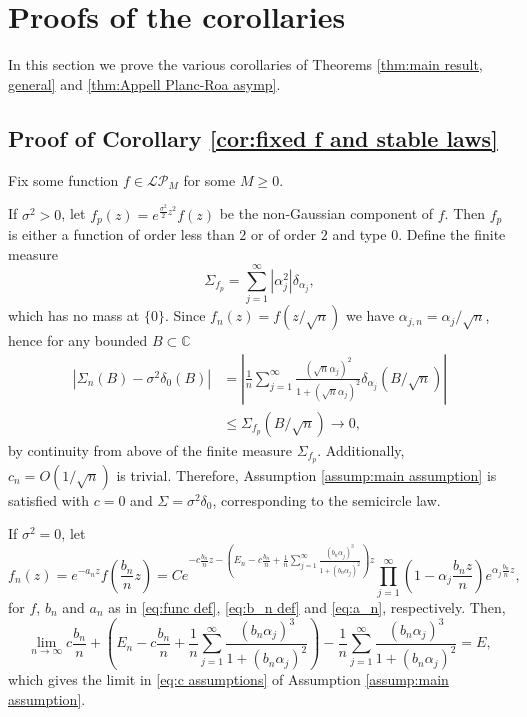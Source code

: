 \documentclass[reqno]{amsart}
\newcommand{\1}{\mathbf{1}}
\newcommand{\C}{\mathbb{C}}
\newcommand{\LP}{\mathcal{LP}}
\theoremstyle{plain}
\theoremstyle{definition}
\theoremstyle{remark}
\numberwithin{equation}{section}
\begin{document}
	
	\section{Proofs of the corollaries}\label{sec:cors} In this section we prove the various corollaries of Theorems \ref{thm:main result, general} and \ref{thm:Appell Planc-Roa asymp}. 
	
		\subsection{Proof of Corollary \ref{cor:fixed f and stable laws} } Fix some function $f\in\LP_M$ for some $M\geq0$. 
		
	If $\sigma^2>0$, let $f_{p}(z)=e^{\frac{\sigma^2}{2}z^2}f(z)$ be the non-Gaussian component of $f$. Then $f_p$ is either a function of order less than $2$ or of order $2$ and type $0$.  Define the finite measure \begin{equation}
		\Sigma_{f_p}=\sum_{j=1}^{\infty}|{\alpha_{j}^2}|\delta_{\alpha_{j}},
	\end{equation} which has no mass at $\{0\}$.  Since $f_n(z)=f(z/\sqrt n)$ we have $\alpha_{j,n}=\alpha_j/\sqrt n$, hence for any bounded  $B\subset\C$ \begin{equation}
	\begin{aligned}
		\left|\Sigma_{n}(B)-\sigma^2\delta_{0}(B)\right|&=\left|\frac{1}{n}\sum_{j=1}^\infty\frac{(\sqrt{n}\alpha_{j})^2}{1+(\sqrt{n}\alpha_{j})^2}\delta_{\alpha_{j}}(B/\sqrt{n})\right|\\
			&\leq \Sigma_{f_p}(B/\sqrt{n}) \to 0,
	\end{aligned}
	\end{equation} by continuity from above of the finite measure $\Sigma_{f_p}$.
	 Additionally, $c_n=O(1/\sqrt{n})$ is trivial. Therefore, Assumption \ref{assump:main assumption} is satisfied with $c=0$ and $\Sigma=\sigma^2\delta_0$, corresponding to the semicircle law. 
	
	If $\sigma^2=0$, let \begin{equation}\label{eq:f_n expanded}
		f_n(z)=e^{-a_nz}f\left(\frac{b_n}{n}z\right)=Ce^{-c\frac{b_n}{n}z-\left(E_n-c\frac{b_n}{n}+\frac{1}{n}\sum_{j=1}^{\infty}\frac{(b_n\alpha_{j})^3}{1+(b_n\alpha_{j})^2}\right) z}\prod_{j=1}^{\infty}\left(1-\alpha_{j}\frac{b_nz}{n}\right)e^{\alpha_{j}\frac{b_n}{n}z},
	\end{equation}  for $f$, $b_n$ and $a_n$ as in \eqref{eq:func def}, \eqref{eq:b_n def} and \eqref{eq:a_n}, respectively.  Then, \begin{equation}\label{eq:a_n expanded}
	\lim\limits_{n\rightarrow\infty} c\frac{b_n}{n}+\left(E_n-c\frac{b_n}{n}+\frac{1}{n}\sum_{j=1}^{\infty}\frac{(b_n\alpha_{j})^3}{1+(b_n\alpha_{j})^2}\right)-\frac{1}{n}\sum_{j=1}^{\infty}\frac{(b_n\alpha_{j})^3}{1+(b_n\alpha_{j})^2}=E,
	\end{equation} which gives the limit in \eqref{eq:c assumptions} of Assumption \ref{assump:main assumption}. 
		
\end{document}

